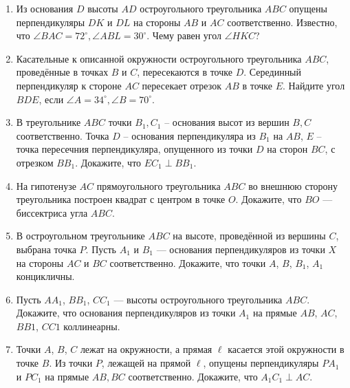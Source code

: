 \begin{enumerate}
    \item Из основания $D$ высоты $AD$ остроугольного треугольника $ABC$ опущены перпендикуляры $DK$ и $DL$ на стороны $AB$ и $AC$ соответственно. Известно, что $\angle BAC = 72^\circ, \angle ABL = 30^\circ$. Чему равен угол $\angle HKC$?

    \item Касательные к описанной окружности остроугольного треугольника $ABC$, проведённые в точках $B$ и $C$, пересекаются в точке $D$. Серединный перпендикуляр к стороне $AC$ пересекает отрезок $AB$ в точке $E$. Найдите угол $BDE$, если $\angle A = 34^\circ, \angle B = 70^\circ$.
    
    \item В треугольнике $ABC$ точки $B_1, C_1$ -- основания высот из вершин $B, C$ соответственно. Точка $D$ -- основания перпендикуляра из $B_1$ на $AB$, $E$ -- точка пересечния перпендикуляра, опущенного из точки $D$ на сторон $BC$, с отрезком $BB_1$. Докажите, что $EC_1 \perp BB_1$.

    \item На гипотенузе $AC$ прямоугольного треугольника $ABC$ во внешнюю сторону треугольника построен квадрат с центром в точке $O$. Докажите, что $BO$ — биссектриса угла $ABC$.

    \item В остроугольном треугольнике $ABC$ на высоте, проведённой из вершины $C$, выбрана точка $P$. Пусть $A_1$ и $B_1$ — основания перпендикуляров из точки $X$ на стороны $AC$ и $BC$ соответственно. Докажите, что точки $A$, $B$, $B_1$, $A_1$ концикличны.

    \item Пусть $AA_1$, $BB_1$, $CC_1$ — высоты остроугольного треугольника $ABC$. Докажите, что основания перпендикуляров из точки $A_1$ на прямые $AB$, $AC$, $BB1$, $CC1$ коллинеарны.

    \item Точки $A$, $B$, $C$ лежат на окружности, а прямая $\ell$ касается этой окружности в точке $B$. Из точки $P$, лежащей на прямой $\ell$, опущены перпендикуляры $PA_1$ и $PC_1$ на прямые $AB, BC$ соответственно. Докажите, что $A_1C_1 \perp AC$.
\end{enumerate}